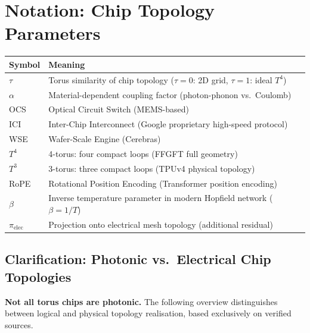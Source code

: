 \section*{Notation: Chip Topology Parameters}

\begin{center}
\renewcommand{\arraystretch}{1.3}
{\small
\begin{tabular}{p{2cm}p{10cm}}
\toprule
\textbf{Symbol} & \textbf{Meaning} \\
\midrule
$\tau$ & Torus similarity of chip topology ($\tau=0$: 2D grid, $\tau=1$: ideal $T^4$) \\
$\alpha$ & Material-dependent coupling factor (photon-phonon vs.\ Coulomb) \\
OCS & Optical Circuit Switch (MEMS-based) \\
ICI & Inter-Chip Interconnect (Google proprietary high-speed protocol) \\
WSE & Wafer-Scale Engine (Cerebras) \\
$T^4$ & 4-torus: four compact loops (FFGFT full geometry) \\
$T^3$ & 3-torus: three compact loops (TPUv4 physical topology) \\
RoPE & Rotational Position Encoding (Transformer position encoding) \\
$\beta$ & Inverse temperature parameter in modern Hopfield network ($\beta = 1/T$) \\
$\pi_\text{elec}$ & Projection onto electrical mesh topology (additional residual) \\
\bottomrule
\end{tabular}
}
\end{center}



\subsection{Clarification: Photonic vs.\ Electrical Chip Topologies}

\textbf{Not all torus chips are photonic.} The following overview
distinguishes between logical and physical topology realisation,
based exclusively on verified sources.

